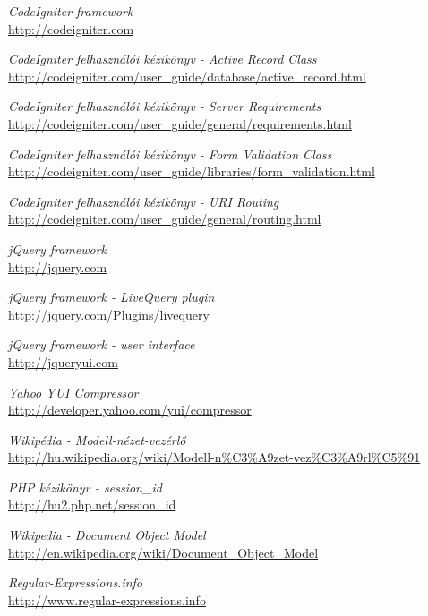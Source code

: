 \documentclass[12pt,a4paper,twoside]{article}
\begin{document}
\clearpage
{}
{}
\begin{thebibliography}{99}

  \emph{CodeIgniter framework}\\
  \url{http://codeigniter.com}

  \emph{CodeIgniter felhasználói kézikönyv - Active Record Class}\\
  \url{http://codeigniter.com/user_guide/database/active_record.html}

  \emph{CodeIgniter felhasználói kézikönyv - Server Requirements}\\
  \url{http://codeigniter.com/user_guide/general/requirements.html}

  \emph{CodeIgniter felhasználói kézikönyv - Form Validation Class}\\
  \url{http://codeigniter.com/user_guide/libraries/form_validation.html}

  \emph{CodeIgniter felhasználói kézikönyv - URI Routing}\\
  \url{http://codeigniter.com/user_guide/general/routing.html}

  \emph{jQuery framework}\\
  \url{http://jquery.com}

  \emph{jQuery framework - LiveQuery plugin}\\
  \url{http://jquery.com/Plugins/livequery}

  \emph{jQuery framework - user interface}\\
  \url{http://jqueryui.com}

  \emph{Yahoo YUI Compressor}\\
  \url{http://developer.yahoo.com/yui/compressor}

  \emph{Wikipédia - Modell-nézet-vezérlő}\\
  \url{http://hu.wikipedia.org/wiki/Modell-n\%C3\%A9zet-vez\%C3\%A9rl\%C5\%91}

  \emph{PHP kézikönyv - session\_id}\\
  \url{http://hu2.php.net/session_id}

  \emph{Wikipedia - Document Object Model}\\
  \url{http://en.wikipedia.org/wiki/Document_Object_Model}

  \emph{Regular-Expressions.info}\\
  \url{http://www.regular-expressions.info}


\end{thebibliography}
\end{document}
